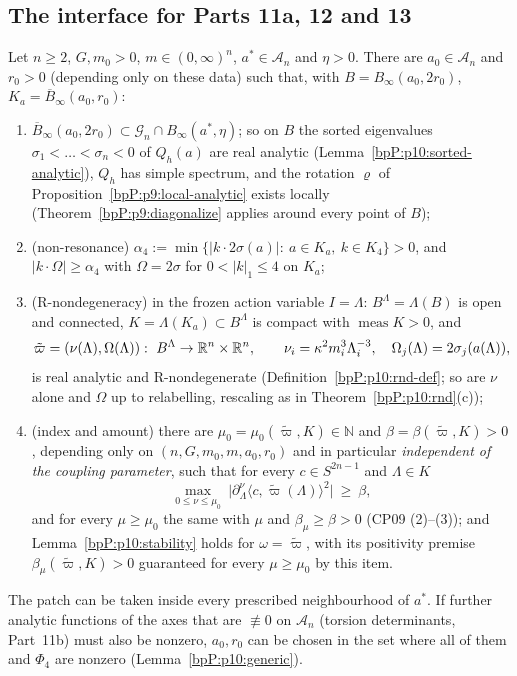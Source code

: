 \subsection{The interface for Parts 11a, 12 and 13}\label{bpP:p10:sec-interface}

\begin{theorem}\label{bpP:p10:interface}
Let $n\ge2$, $G,m_0>0$, $m\in(0,\infty)^n$, $a^*\in\mathcal A_n$ and $\eta>0$. There are $a_0\in\mathcal A_n$ and $r_0>0$ (depending only on these data) such that, with $B=B_\infty(a_0,2r_0)$, $K_a=\overline B_\infty(a_0,r_0)$:
\begin{enumerate}[label=(\alph*)]
\item $\overline B_\infty(a_0,2r_0)\subset\mathcal G_n\cap B_\infty(a^*,\eta)$; so on $B$ the sorted eigenvalues $\sigma_1<\dots<\sigma_n<0$ of $Q_h(a)$ are real analytic (Lemma~\ref{bpP:p10:sorted-analytic}), $Q_h$ has simple spectrum, and the rotation $\varrho$ of Proposition~\ref{bpP:p9:local-analytic} exists locally (Theorem~\ref{bpP:p9:diagonalize} applies around every point of $B$);
\item (non-resonance) $\alpha_4:=\min\{\lvert k\cdot2\sigma(a)\rvert:\ a\in K_a,\ k\in K_4\}>0$, and $\lvert k\cdot\Omega\rvert\ge\alpha_4$ with $\Omega=2\sigma$ for $0<\lvert k\rvert_1\le4$ on $K_a$;
\item (R-nondegeneracy) in the frozen action variable $I=\Lambda$: $B^\Lambda=\Lambda(B)$ is open and connected, $K=\Lambda(K_a)\subset B^\Lambda$ is compact with $\operatorname{meas}K>0$, and
\[\tilde\varpi=(\nu(\Lambda),\Omega(\Lambda)):\ B^\Lambda\to\R^n\times\R^n,\qquad\nu_i=\kappa^2m_i^3\Lambda_i^{-3},\quad\Omega_j(\Lambda)=2\sigma_j(a(\Lambda)),\]
is real analytic and R-nondegenerate (Definition~\ref{bpP:p10:rnd-def}; so are $\nu$ alone and $\Omega$ up to relabelling, rescaling as in Theorem~\ref{bpP:p10:rnd}(c));
\item (index and amount) there are $\mu_0=\mu_0(\tilde\varpi,K)\in\mathbb N$ and $\beta=\beta(\tilde\varpi,K)>0$, depending only on $(n,G,m_0,m,a_0,r_0)$ and in particular \emph{independent of the coupling parameter}, such that for every $c\in S^{2n-1}$ and $\Lambda\in K$
\[\max_{0\le\nu\le\mu_0}\ \big\lvert\partial_\Lambda^\nu\langle c,\tilde\varpi(\Lambda)\rangle^2\big\rvert\ \ge\ \beta ,\]
and for every $\mu\ge\mu_0$ the same with $\mu$ and $\beta_\mu\ge\beta>0$ (CP09 (2)--(3)); and Lemma~\ref{bpP:p10:stability} holds for $\omega=\tilde\varpi$, with its positivity premise $\beta_\mu(\tilde\varpi,K)>0$ guaranteed for every $\mu\ge\mu_0$ by this item.
\end{enumerate}
The patch can be taken inside every prescribed neighbourhood of $a^*$. If further analytic functions of the axes that are $\not\equiv0$ on $\mathcal A_n$ (torsion determinants, Part~11b) must also be nonzero, $a_0,r_0$ can be chosen in the set where all of them and $\Phi_4$ are nonzero (Lemma~\ref{bpP:p10:generic}).
\end{theorem}
